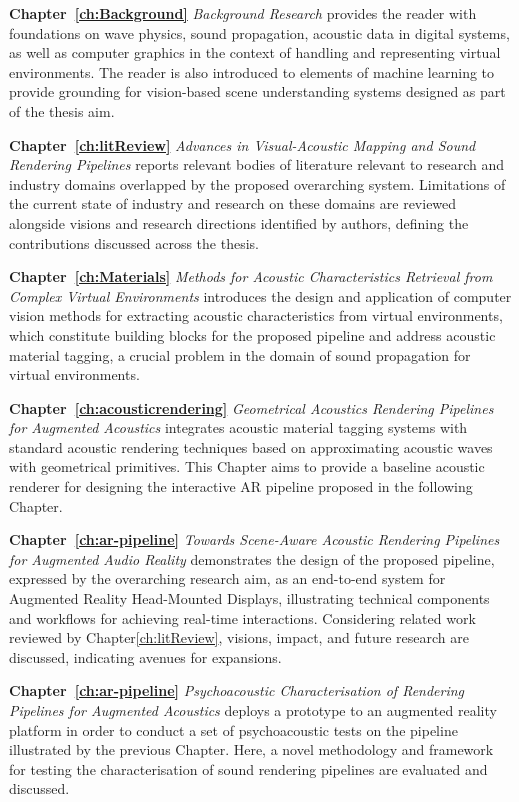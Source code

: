 \textbf{Chapter~\ref{ch:Background}} \textit{Background Research} provides the reader with foundations on wave physics, sound propagation, acoustic data in digital systems, as well as computer graphics in the context of handling and representing virtual environments. The reader is also introduced to elements of machine learning to provide grounding for vision-based scene understanding systems designed as part of the thesis aim.

\textbf{Chapter~\ref{ch:litReview}} \textit{Advances in Visual-Acoustic Mapping and Sound Rendering Pipelines} reports relevant bodies of literature relevant to research and industry domains overlapped by the proposed overarching system. Limitations of the current state of industry and research on these domains are reviewed alongside visions and research directions identified by authors, defining the contributions discussed across the thesis.

\textbf{Chapter~\ref{ch:Materials}} \textit{Methods for Acoustic Characteristics Retrieval from Complex Virtual Environments} introduces the design and application of computer vision methods for extracting acoustic characteristics from virtual environments, which constitute building blocks for the proposed pipeline and address acoustic material tagging, a crucial problem in the domain of sound propagation for virtual environments.

\textbf{Chapter~\ref{ch:acousticrendering}} \textit{Geometrical Acoustics Rendering Pipelines for Augmented Acoustics} integrates acoustic material tagging systems with standard acoustic rendering techniques based on approximating acoustic waves with geometrical primitives. This Chapter aims to provide a baseline acoustic renderer for designing the interactive AR pipeline proposed in the following Chapter.

\textbf{Chapter~\ref{ch:ar-pipeline}} \textit{Towards Scene-Aware Acoustic Rendering Pipelines for Augmented Audio Reality} demonstrates the design of the proposed pipeline, expressed by the overarching research aim, as an end-to-end system for Augmented Reality Head-Mounted Displays, illustrating technical components and workflows for achieving real-time interactions. Considering related work reviewed by Chapter\ref{ch:litReview}, visions, impact, and future research are discussed, indicating avenues for expansions.

\textbf{Chapter~\ref{ch:ar-pipeline}} \textit{Psychoacoustic Characterisation of Rendering Pipelines for Augmented Acoustics} deploys a prototype to an augmented reality platform in order to conduct a set of psychoacoustic tests on the pipeline illustrated by the previous Chapter. Here, a novel methodology and framework for testing the characterisation of sound rendering pipelines are evaluated and discussed.

